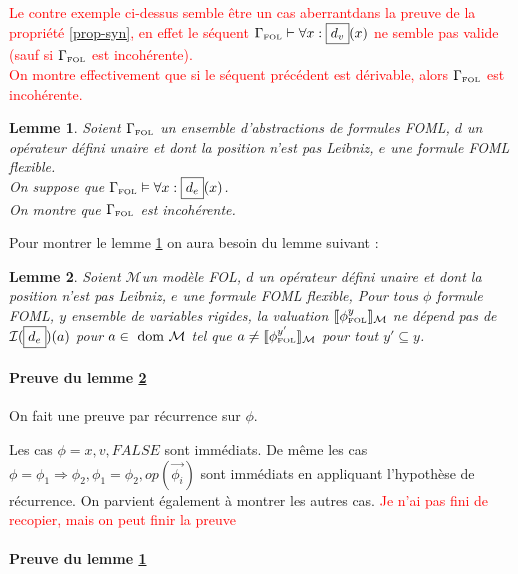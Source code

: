\documentclass[12pt]{article}
\newcommand{\FOL}{\ensuremath{\textup{\tiny{}FOL}}}
\newcommand{\M}{\ensuremath{\mathcal{M}}}
\newcommand{\I}{\ensuremath{\mathcal{I}}}
\newcommand{\dom}{\ensuremath{\textup{ dom }}}
\newcommand{\raph}[1]{\textcolor{red}{#1}}
\newtheorem{lem}{Lemme}
\begin{document}
\raph{%
  Le contre exemple ci-dessus semble être un cas \og{}aberrant\fg dans la preuve de la propriété \ref{prop-syn},
  en effet le séquent \(\Gamma_\FOL \vdash \forall x : \framebox{$d_v$}(x) \) ne semble pas valide (sauf si $\Gamma_\FOL$ est incohérente).\\
  On montre effectivement que si le séquent précédent est dérivable, alors $\Gamma_\FOL$ est incohérente.}

\vspace{1cm}

\begin{lem}
  \label{lemme-T}
  Soient $\Gamma_\FOL$ un ensemble d'abstractions de formules FOML,
  $d$ un opérateur défini unaire et dont la position n'est pas Leibniz,
  $e$ une formule FOML flexible.\\
  On suppose que \(\Gamma_\FOL \vDash \forall x : \framebox{$d_e$}(x) \).\\
  On montre que $\Gamma_\FOL$ est incohérente.
\end{lem}

Pour montrer le lemme \ref{lemme-T} on aura besoin du lemme suivant :

\begin{lem}
  \label{lemme-S}
  Soient \M un modèle FOL,
  $d$ un opérateur défini unaire et dont la position n'est pas Leibniz,
  $e$ une formule FOML flexible,
  Pour tous $\phi$ formule FOML, $y$ ensemble de variables rigides,
  la valuation $\llbracket \phi_\FOL^y \rrbracket_\M$ ne dépend pas de \(\I(\framebox{$d_e$})(a)\) pour
  $a \in \dom \M$ tel que $a \neq \llbracket \phi_\FOL^{y'} \rrbracket_\M$ pour tout $y' \subseteq y$.
\end{lem}

\paragraph{Preuve du lemme \ref{lemme-S}}

On fait une preuve par récurrence sur $\phi$.

Les cas $\phi = x, v, FALSE$ sont immédiats.
De même les cas $\phi = \phi_1 \Rightarrow \phi_2, \phi_1 = \phi_2, op(\vec{\phi_i})$ sont immédiats en appliquant l'hypothèse de récurrence.
On parvient également à montrer les autres cas. \raph{Je n'ai pas fini de recopier, mais on peut finir la preuve}

\paragraph{Preuve du lemme \ref{lemme-T}}
\end{document}
